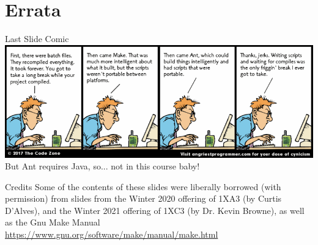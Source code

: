 \documentclass[11pt]{beamer}
\begin{document}
\section[Errata]{Errata}
\begin{frame}{Last Slide Comic}
\center
\includegraphics[scale=0.35]{makefiles.png} \\
But Ant requires Java, so... not in this course baby! 
\end{frame}

\begin{frame}{Credits}
\center
\vspace{8em}
Some of the contents of these slides were liberally borrowed (with permission) from slides from the Winter 2020 offering of 1XA3 (by Curtis D'Alves), and the Winter 2021 offering of 1XC3 (by Dr. Kevin Browne), as well as the Gnu Make Manual \url{https://www.gnu.org/software/make/manual/make.html} 
\end{frame}
\end{document}
